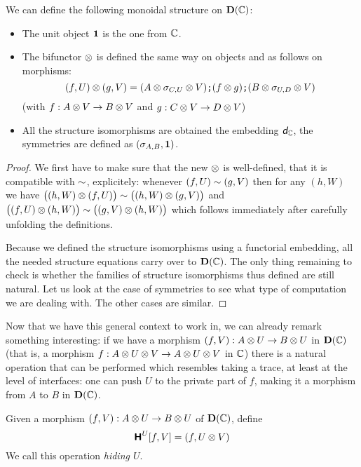 \begin{proposition}
	We can define the following monoidal structure on $\mathbf D(\mathbb{C})$:
	\begin{itemize}
		\item The unit object $\mathbf 1$ is the one from $\mathbb{C}$.
		\item The bifunctor $\otimes$ is defined the same way on objects and as follows on morphisms:
		$$(f,U)\otimes(g,V)=(A\otimes \sigma_{C,U}\otimes V)\textbf{\tt;}(f\otimes g)\textbf{\tt;}(B\otimes \sigma_{U,D}\otimes V)
		$$
		(with $f:A\otimes V\rightarrow B\otimes V$ and $g:C\otimes V\rightarrow D\otimes V$)
		\item All the structure isomorphisms are obtained \via the embedding $\textit{\textsf{d}}_{\mathbb{C}}$, \eg the
		symmetries are defined as $(\sigma_{A,B}, \mathbf 1)$.
	\end{itemize}
\end{proposition}

\begin{proof}
	We first have to make sure that the new $\otimes$ is well-defined, \ie that it is compatible with
	$\sim$, explicitely: whenever $(f,U)\sim(g,V)$ then for any $(h,W)$ we have 
	$\big((h,W)\otimes(f,U)\big)\sim\big((h,W)\otimes(g,V)\big)$ and 
	$\big((f,U)\otimes(h,W)\big)\sim\big((g,V)\otimes(h,W)\big)$ which follows immediately after carefully
	unfolding the definitions.

	Because we defined the structure isomorphisms using a functorial embedding, all the needed
	structure equations carry over to $\mathbf D(\mathbb{C})$. The only thing remaining to check is whether
	the families of structure isomorphisms thus defined are still natural.
	Let us look at the case of symmetries to see what type of computation we are dealing with. The
	other cases are similar.
	
\end{proof}

Now that we have this general context to work in, we can already remark something interesting:
if we have a morphism $(f,V):A\otimes U\rightarrow B\otimes U$ in $\mathbf D(\mathbb{C})$ (that is, a morphism
$f:A\otimes U\otimes V\rightarrow A\otimes U\otimes V$ in $\mathbb{C}$) there is a natural operation that can be
performed which resembles taking a trace, at least at the level of interfaces: one can push $U$
to the private part of $f$, making it a morphism from $A$ to $B$ in $\mathbf D(\mathbb{C})$.

\begin{definition}[Hiding]
	Given a morphism $(f,V):A\otimes U\rightarrow B\otimes U$ of $\mathbf D(\mathbb{C})$, define 
	$${\normalfont\textsf{\textbf{H}}^{U}}[f,V]=(f,U\otimes V)$$
	We call this operation \emph{hiding $U$}.
\end{definition}

